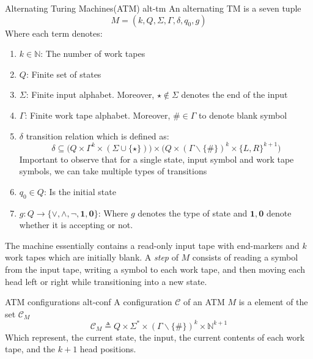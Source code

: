 \begin{definitionbox}{Alternating Turing Machines(ATM) \cite{kozen_TheoryComputation_2006, chandra1981alternation}}{alt-tm}
    An alternating TM is a seven tuple
    $$
        M = (k , Q, \Sigma, \Gamma, \delta, q_0, g)
    $$
    Where each term denotes:
    \begin{enumerate}
        \item $k \in \mathbb{N}$: The number of work tapes
        \item $Q$: Finite set of states
        \item $\Sigma$: Finite input alphabet. Moreover, $\star \not\in \Sigma$ denotes the end of the input
        \item $\Gamma$: Finite work tape alphabet. Moreover, $\# \in \Gamma$ to denote blank symbol
        \item $\delta$ transition relation which is defined as:
              $$
                  \delta \subseteq \Big(Q \times \Gamma^k \times (\Sigma \cup \{\star\}) \Big)\times
                  \Big(Q \times (\Gamma \smallsetminus \{\#\})^k \times \{L, R\}^{k+1} \Big)
              $$
              Important to observe that for a single state, input symbol and work tape symbols, we can take multiple types of transitions
        \item $q_0 \in Q$: Is the initial state
        \item $g : Q \to \{\vee, \wedge, \neg , \textbf{1}, \textbf{0}\}$: Where $g$ denotes the type of state
              and $\mathbf{1}, \mathbf{0}$  denote whether it is accepting or not.

    \end{enumerate}

\end{definitionbox}

The machine essentially contains a read-only input tape with end-markers and $k$ work tapes which are
initially blank. A \textit{step} of $M$ consists of reading a symbol from the input tape,
writing a symbol to each work tape, and then moving each head left or right
while transitioning into a new state.

\begin{definitionbox}{ATM configurations \cite{kozen_TheoryComputation_2006, chandra1981alternation}}{alt-conf}
    A configuration $\mathcal{C}$ of an ATM $M$ is a element of the set $\mathcal{C}_M$
    $$
        \mathcal{C}_M \triangleq Q \times \Sigma^* \times (\Gamma \smallsetminus \{\#\})^k \times \mathbb{N}^{k+1}
    $$
    Which represent, the current state, the input, the current contents of each work tape, and the $k+1$ head positions.
\end{definitionbox}

